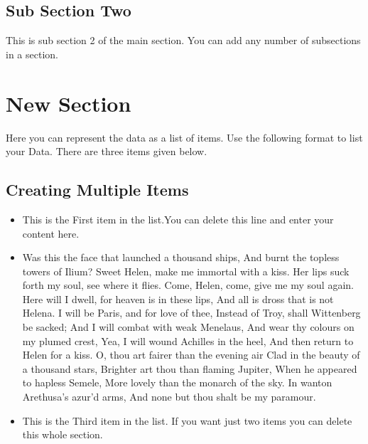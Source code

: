 \documentclass[a4paper, 10pt, conference]{ieeeconf}      %
\begin{document}
\subsection{Sub Section Two}

This is sub section 2 of the main section.
You can add any number of subsections in a section.

\section{New Section}

Here you can represent the data as a list of items. 
Use the following format to list your Data.
There are three items given below.

\subsection{Creating Multiple Items}

\begin{itemize}

\item
 This is the First item in the list.You can delete this line and enter your content here.
 
 
\item

Was this the face that launched a thousand ships,
And burnt the topless towers of Ilium?
Sweet Helen, make me immortal with a kiss.
Her lips suck forth my soul, see where it flies.
Come, Helen, come, give me my soul again.
Here will I dwell, for heaven is in these lips,
And all is dross that is not Helena.
I will be Paris, and for love of thee,
Instead of Troy, shall Wittenberg be sacked;
And I will combat with weak Menelaus,
And wear thy colours on my plumed crest,
Yea, I will wound Achilles in the heel,
And then return to Helen for a kiss.
O, thou art fairer than the evening air
Clad in the beauty of a thousand stars,
Brighter art thou than flaming Jupiter,
When he appeared to hapless Semele,
More lovely than the monarch of the sky.
In wanton Arethusa's azur'd arms,
And none but thou shalt be my paramour. 


\item 

This is the Third item in the list. If you want just two items you can delete this whole section.

\end{itemize}
\end{document}
